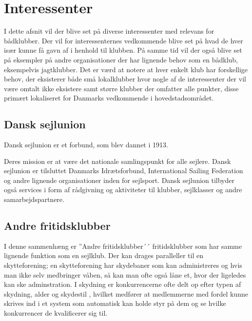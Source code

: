 \chapter{Interessenter}\label{chap:interessenter}

\cbstart

I dette afsnit vil der blive set på diverse interessenter med relevans for bådklubber. Der vil for
interessenternes vedkommende blive set på hvad de hver især kunne få gavn af i henhold til klubben. På
samme tid vil der også blive set på eksempler på andre organisationer der har lignende behov som en bådklub,
eksempelvis jagtklubber. Det er værd at notere at hver enkelt klub har forskellige behov, der eksisterer både
små lokalklubber hvor nogle af de interessenter der vil være omtalt ikke eksistere samt større klubber der
omfatter alle punkter, disse primært lokaliseret for Danmarks vedkommende i hovedstadsområdet.


\section{Dansk sejlunion}

Dansk sejlunion er et forbund, som blev dannet i 1913.

Deres mission er at være det nationale samlingspunkt for alle sejlere. Dansk sejlunion er tilsluttet Danmarks
Idrætsforbund, International Sailing Federation og andre lignende organisationer inden for sejlsport. Dansk
sejlunion tilbyder også services i form af rådgivning og aktiviteter til klubber, sejlklasser og andre
samarbejdspartnere.


\section{Andre fritidsklubber}

I denne sammenhæng er ''Andre fritidsklubber´´ fritidsklubber som har samme lignende funktion som en sejlklub.
Der kan drages paralleller til en skytteforening; en skytteforening har skydebaner som kan administreres og
hvis man ikke selv medbringer våben, så kan man ofte også låne et, hvor der ligeledes kan ske adminstration. I
skydning er konkurrencerne ofte delt op efter typen af skydning, alder og skydestil , hvilket
medfører at medlemmerne med fordel kunne skrives ind i et system som automatisk kan holde styr på dem og se
hvilke konkurrencer de kvalificerer sig til.



